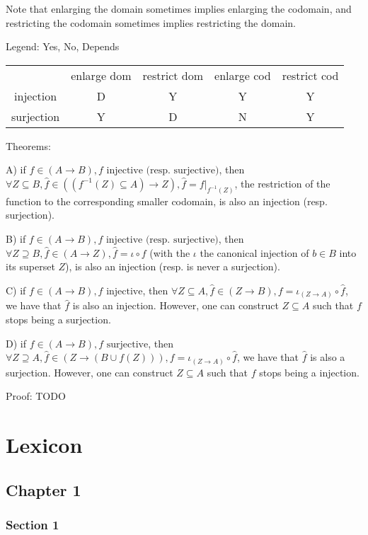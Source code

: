\documentclass[12pt, letterpaper, twoside]{report}
\begin{document}
Note that enlarging the domain sometimes implies enlarging the codomain, and restricting the codomain sometimes implies restricting the domain.

Legend: Yes, No, Depends

\begin{tabular}{c c c c c}
			& enlarge dom	& restrict dom	& enlarge cod	& restrict cod \\
injection	& D				& Y				& Y				& Y            \\
surjection	& Y				& D				& N				& Y
\end{tabular}


Theorems:

A) if $f \in (A \to B), f \text{ injective (resp. surjective)}$, then $\forall Z \subseteq B, \hat{f} \in ((f^{-1}(Z) \subseteq A) \to Z), \hat{f} = f|_{f^{-1}(Z)}$, the restriction of the function to the corresponding smaller codomain, is also an injection (resp. surjection).

B) if $f \in (A \to B), f \text{ injective (resp. surjective)}$, then $\forall Z \supseteq B, \hat{f} \in (A \to Z), \hat{f} = \iota \circ f$ (with the $\iota$ the canonical injection of $b \in B$ into its superset $Z$), is also an injection (resp. is never a surjection).

C) if $f \in (A \to B), f \text{ injective}$, then $\forall Z \subseteq A, \hat{f} \in (Z \to B), f = \iota_{(Z \to A)} \circ \hat{f}$, we have that $\hat{f}$ is also an injection. However, one can construct $Z \subseteq A$ such that $f$ stops being a surjection.

D) if $f \in (A \to B), f \text{ surjective}$, then $\forall Z \supseteq A, \hat{f} \in (Z \to (B \cup f(Z))), f = \iota_{(Z \to A)} \circ \hat{f}$, we have that $\hat{f}$ is also a surjection. However, one can construct $Z \subseteq A$ such that $f$ stops being a injection.

Proof: TODO

\newpage
\part{Lexicon}
\chapter*{Chapter 1}

\section*{Section 1}
\end{document}
